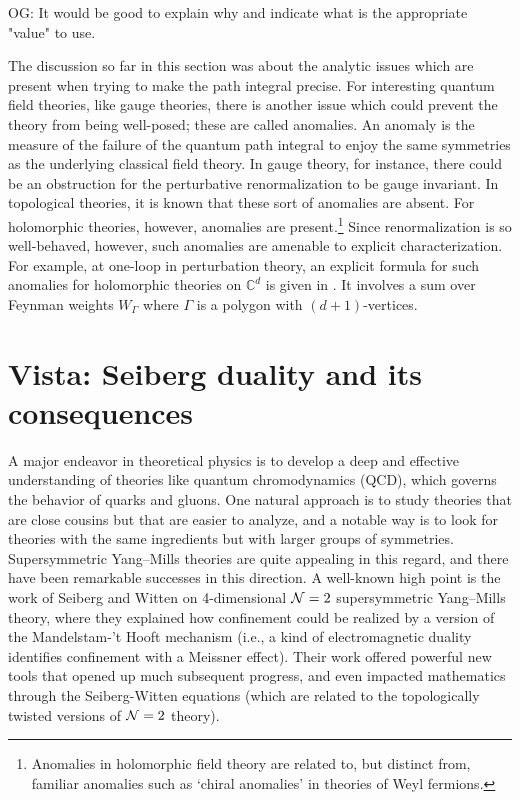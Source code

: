 \documentclass[11pt]{amsart}
\def\C{{\mathbb{C}}}
\def\owen#1{{\textcolor{violet!50!black}{OG: {#1}}}}
\begin{document}
\owen{It would be good to explain why and indicate what is the appropriate "value" to use.}

The discussion so far in this section was about the analytic issues which are present when trying to make the path integral precise.
For interesting quantum field theories, like gauge theories, there is another issue which could prevent the theory from being well-posed; these are called anomalies.
An anomaly is the measure of the failure of the quantum path integral to enjoy the same symmetries as the underlying classical field theory.
In gauge theory, for instance, there could be an obstruction for the perturbative renormalization to be gauge invariant.
In topological theories, it is known that these sort of anomalies are absent.
For holomorphic theories, however, anomalies are present.\footnote{Anomalies in holomorphic field theory are related to, but distinct from, familiar anomalies such as `chiral anomalies' in theories of Weyl fermions.}
Since renormalization is so well-behaved, however, such anomalies are amenable to explicit characterization.
For example, at one-loop in perturbation theory, an explicit formula for such anomalies for holomorphic theories on $\C^d$ is given in \cite{Whol}.
It involves a sum over Feynman weights $W_\Gamma$ where $\Gamma$ is a polygon with $(d+1)$-vertices.

\section{Vista: Seiberg duality and its consequences}
\label{sec: seiberg}

A major endeavor in theoretical physics is to develop a deep and effective understanding of theories like quantum chromodynamics (QCD), which governs the behavior of quarks and gluons.
One natural approach is to study theories that are close cousins but that are easier to analyze,
and a notable way is to look for theories with the same ingredients but with larger groups of symmetries.
Supersymmetric Yang--Mills theories are quite appealing in this regard,
and there have been remarkable successes in this direction.
A well-known high point is the work of Seiberg and Witten on 4-dimensional $\mathcal N =2$ supersymmetric Yang--Mills theory,
where they explained how confinement could be realized by a version of the Mandelstam-'t Hooft mechanism (i.e., a kind of electromagnetic duality identifies confinement with a Meissner effect).
Their work offered powerful new tools that opened up much subsequent progress,
and even impacted mathematics through the Seiberg-Witten equations (which are related to the topologically twisted versions of $\mathcal N=2$ theory).
\end{document}
